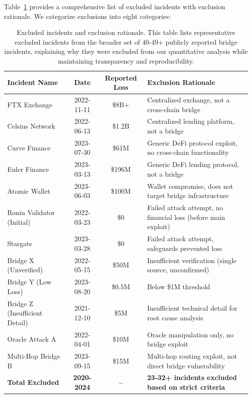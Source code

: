 \documentclass[runningheads]{llncs}
\begin{document}
Table~\ref{tab:excluded_incidents} provides a comprehensive list of excluded incidents with exclusion rationale. We categorize exclusions into eight categories:

\begin{table}[!ht]
    \centering
    \scriptsize
    \caption{Excluded incidents and exclusion rationale. This table lists representative excluded incidents from the broader set of 40-49+ publicly reported bridge incidents, explaining why they were excluded from our quantitative analysis while maintaining transparency and reproducibility.}
    \label{tab:excluded_incidents}
    \begin{tabular}{lccp{5cm}}
        \toprule
        \textbf{Incident Name} & \textbf{Date} & \textbf{Reported Loss} & \textbf{Exclusion Rationale} \\
        \midrule
        FTX Exchange & 2022-11-11 & \$8B+ & Centralized exchange, not a cross-chain bridge \\
        Celsius Network & 2022-06-13 & \$1.2B & Centralized lending platform, not a bridge \\
        Curve Finance & 2023-07-30 & \$61M & Generic DeFi protocol exploit, no cross-chain functionality \\
        Euler Finance & 2023-03-13 & \$196M & Generic DeFi lending protocol, not a bridge \\
        Atomic Wallet & 2023-06-03 & \$100M & Wallet compromise, does not target bridge infrastructure \\
        Ronin Validator (Initial) & 2022-03-23 & \$0 & Failed attack attempt, no financial loss (before main exploit) \\
        Stargate & 2023-03-28 & \$0 & Failed attack attempt, safeguards prevented loss \\
        Bridge X (Unverified) & 2022-05-15 & \$50M & Insufficient verification (single source, unconfirmed) \\
        Bridge Y (Low Loss) & 2023-08-20 & \$0.5M & Below \$1M threshold \\
        Bridge Z (Insufficient Detail) & 2021-12-10 & \$5M & Insufficient technical detail for root cause analysis \\
        Oracle Attack A & 2022-04-01 & \$10M & Oracle manipulation only, no bridge exploit \\
        Multi-Hop Bridge B & 2023-09-15 & \$15M & Multi-hop routing exploit, not direct bridge vulnerability \\
        \midrule
        \textbf{Total Excluded} & \textbf{2020-2024} & \textbf{--} & \textbf{23-32+ incidents excluded based on strict criteria} \\

\end{tabular}
\end{table}
\end{document}
